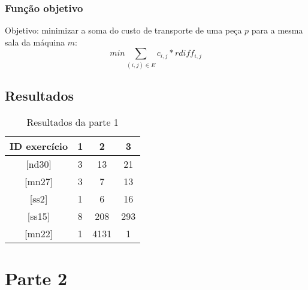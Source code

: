 \documentclass[11pt,letterpaper]{article}
\begin{document}
\subsubsection*{Função objetivo}
Objetivo: minimizar a soma do custo de transporte de uma peça $p$ para
a mesma sala da máquina $m$:
\begin{equation}
min\sum_{(i,j) \in E}c_{i,j}*rdiff_{i,j}
\end{equation}



\subsection{Resultados}


\begin{table}[h!]
\begin{centering}
\begin{tabular}{|c|c|c|c|}
\hline 
ID exercício & 1 & 2 & 3\tabularnewline
\hline 
\hline 
{[}nd30{]}  & 3 & 13  & 21 \tabularnewline
\hline 
 {[}mn27{]} & 3 & 7 & 13 \tabularnewline
\hline 
 {[}ss2{]} & 1 & 6  & 16 \tabularnewline
\hline 
{[}ss15{]} & 8 & 208  & 293 \tabularnewline
\hline 
 {[}mn22{]} & 1 & 4131  & 1 \tabularnewline
\hline 
\end{tabular}
\par\end{centering}

\caption{Resultados da parte 1}
\end{table}


\section{Parte 2}



%
%  
\end{document}
